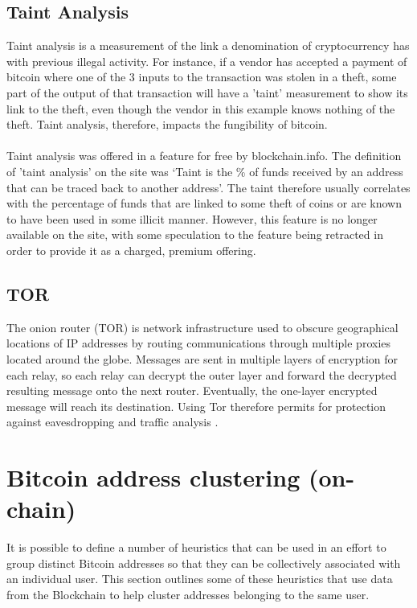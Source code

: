 \subsection{Taint Analysis}\label{background-taint}
Taint analysis is a measurement of the link a denomination of cryptocurrency has with previous illegal activity. For instance, if a vendor has accepted a payment of bitcoin where one of the 3 inputs to the transaction was stolen in a theft, some part of the output of that transaction will have a 'taint' measurement to show its link to the theft, even though the vendor in this example knows nothing of the theft. Taint analysis, therefore, impacts the fungibility of bitcoin. 
\\\\
Taint analysis was offered in a feature for free by blockchain.info. The definition of 'taint analysis' on the site was \lq Taint is the \% of funds received by an address that can be traced back to another address\rq. The taint therefore usually correlates with the percentage of funds that are linked to some theft of coins or are known to have been used in some illicit manner. However, this feature is no longer available on the site, with some speculation to the feature being retracted in order to provide it as a charged, premium offering.

\subsection{TOR}
The onion router (TOR) is network infrastructure used to obscure geographical locations of IP addresses by routing communications through multiple proxies located around the globe. Messages are sent in multiple layers of encryption for each relay, so each relay can decrypt the outer layer and forward the decrypted resulting message onto the next router. Eventually, the one-layer encrypted message will reach its destination. Using Tor therefore permits for protection against eavesdropping and traffic analysis \cite{RefWorks:doc:5c3e103be4b014f3944e4192}.

\section{Bitcoin address clustering (on-chain)}\label{background:clustering}
It is possible to define a number of heuristics that can be used in an effort to group distinct Bitcoin addresses so that they can be collectively associated with an individual user. This section outlines some of these heuristics that use data from the Blockchain to help cluster addresses belonging to the same user.

